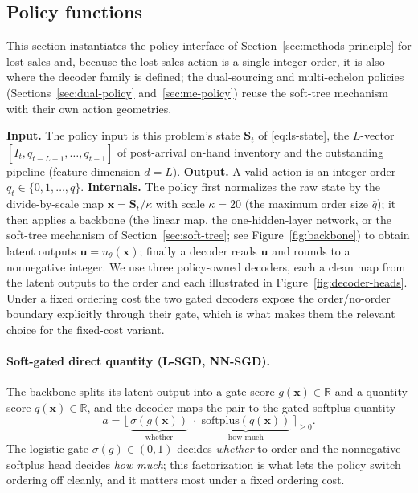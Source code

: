 \documentclass[11pt]{article}
\begin{document}
\FloatBarrier

\subsection{Policy functions}
\label{sec:lostsales-policy}

This section instantiates the policy interface of Section~\ref{sec:methods-principle} for lost sales
and, because the lost-sales action is a single integer order, it is also where the decoder family is
defined; the dual-sourcing and multi-echelon policies (Sections~\ref{sec:dual-policy}
and~\ref{sec:me-policy}) reuse the soft-tree mechanism with their own action geometries.

\medskip\noindent\textbf{Input.} The policy input is this problem's state $\mathbf S_t$ of
\eqref{eq:ls-state}, the $L$-vector $[I_t, q_{t-L+1},\dots,q_{t-1}]$ of post-arrival on-hand inventory
and the outstanding pipeline (feature dimension $d=L$). \textbf{Output.} A valid action is an integer
order $q_t\in\{0,1,\dots,\bar q\}$. \textbf{Internals.} The policy first normalizes the raw state by
the divide-by-scale map $\mathbf{x}=\mathbf{S}_t/\kappa$ with scale $\kappa=20$ (the maximum order
size $\bar q$); it then applies a backbone (the linear map, the one-hidden-layer network, or the
soft-tree mechanism of Section~\ref{sec:soft-tree}; see Figure~\ref{fig:backbone}) to obtain latent
outputs $\mathbf{u}=u_\theta(\mathbf{x})$; finally a decoder reads $\mathbf{u}$ and rounds to a
nonnegative integer. We use three policy-owned decoders, each a clean map from the latent outputs to
the order and each illustrated in Figure~\ref{fig:decoder-heads}. Under a fixed ordering cost the two
gated decoders expose the order/no-order boundary explicitly through their gate, which is what makes
them the relevant choice for the fixed-cost variant.

\paragraph{Soft-gated direct quantity (L-SGD, NN-SGD).}
The backbone splits its latent output into a gate score $g(\mathbf{x})\in\mathbb{R}$ and a quantity
score $q(\mathbf{x})\in\mathbb{R}$, and the decoder maps the pair to the gated softplus quantity
\[
a = \big\lfloor\,\underbrace{\sigma(g(\mathbf{x}))}_{\text{whether}}\;\cdot\;
                \underbrace{\mathrm{softplus}(q(\mathbf{x}))}_{\text{how much}}\,\big\rceil_{\ge 0}.
\]
The logistic gate $\sigma(g)\in(0,1)$ decides \emph{whether} to order and the nonnegative softplus
head decides \emph{how much}; this factorization is what lets the policy switch ordering off cleanly,
and it matters most under a fixed ordering cost.
\end{document}
